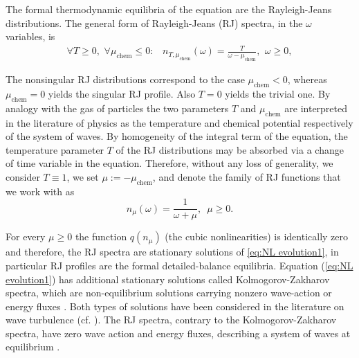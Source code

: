 \documentclass[reqno,11pt,letterpaper]{amsart}
\numberwithin{equation}{section}
\begin{document}
The formal thermodynamic equilibria of the equation are the Rayleigh-Jeans distributions. The general form of Rayleigh-Jeans (RJ) spectra, in the $\omega$ variables, is
\begin{align*}
 \forall T \geq 0,\,\,\forall \mu_{\text{chem}} \le 0:\,\,\,\,\, n_{T, \mu_{\text{chem}}}(\omega) = \frac {T} {\omega -\mu_{\text{chem}} },\,\ \omega \ge 0,
\end{align*}

The nonsingular RJ distributions correspond to the case $\mu_{\text{chem}}<0$, whereas  $\mu_{\text{chem}}=0$ yields the singular RJ profile. Also $T=0$ yields the trivial one. By analogy with the gas of particles the two parameters $T$ and $\mu_{\text{chem}}$  are interpreted in the literature of physics as the temperature and chemical potential respectively of the system of waves. 
By homogeneity of the integral term of the equation, the temperature parameter $T$ of the RJ distributions may be absorbed via a change of time variable in the equation. Therefore,
without any loss of generality, we  consider $T\equiv 1$, we set $\mu:=-\mu_{\text{chem}}$, and denote the family of RJ functions that we work with as 
$$  n_\mu (\omega )=\frac{1}{\omega +\mu  },\,\,\,  \mu \ge 0.$$


For every $\mu \ge 0$ the function $q(n_\mu)$ (the cubic nonlinearities) is identically zero and therefore, the RJ spectra are stationary solutions of \eqref{eq:NL evolution1}, in particular RJ profiles are the formal detailed-balance equilibria. 
Equation (\ref{eq:NL evolution1}) has additional stationary solutions called  Kolmogorov-Zakharov spectra, which are non-equilibrium solutions carrying nonzero wave-action or energy fluxes \cite{Dyachenko:1992}. Both types of solutions have been considered in the literature on wave turbulence (cf. \cite{Dyachenko:1992, ZakLvovFalkov}). The RJ spectra, contrary to the Kolmogorov-Zakharov spectra, have zero wave action and energy fluxes, describing a system of waves at equilibrium \cite{Dyachenko:1992}. 



\end{document}

